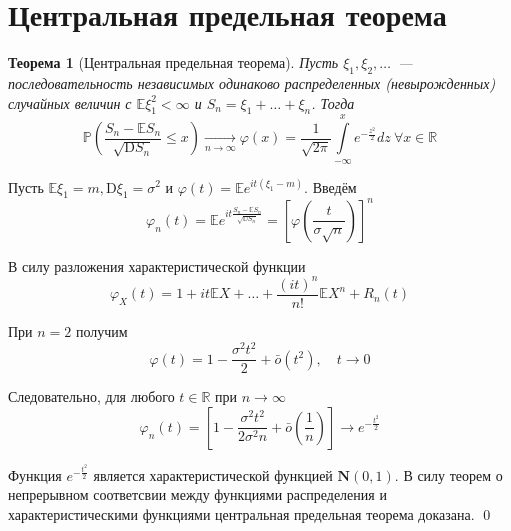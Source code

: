 \documentclass[oneside,final,14pt]{extreport}
\renewenvironment{proof}{{\bfseries Доказательство.}}{\qed}
\newtheorem{thm}{Теорема}[section]
\theoremstyle{definition}
\begin{document}
\section{Центральная предельная теорема}
\begin{thm}[Центральная предельная теорема]
    Пусть $\xi_{1}, \xi_{2}, \ldots$~--- последовательность независимых одинаково распределенных (невырожденных) случайных величин с $\mathbb{E} \xi_{1}^{2}<\infty$ и $S_{n}=\xi_{1}+\ldots+\xi_{n}$. Тогда
    \begin{equation*}
        \mathbb{P}\left(\frac{S_{n}-\mathbb{E} S_{n}}{\sqrt{\mathrm{D} S_{n}}} \leqslant x\right)
        \xrightarrow[n \rightarrow \infty]{}
        \varphi(x) = \frac{1}{\sqrt{2 \pi}} \int\limits_{-\infty}^{x} e^{-\frac{z^{2}}{2}} dz~ \forall x \in \mathbb{R}
    \end{equation*}
\end{thm}
\begin{proof}
Пусть $\mathbb{E} \xi_{1}=m, \mathrm{D} \xi_{1}=\sigma^{2}$ и $\varphi(t)=\mathbb{E} e^{i t\left(\xi_{1}-m\right)}$. Введём
\begin{equation*}
    \varphi_{n}(t)=\mathbb{E} e^{i t \frac{S_{n}-\mathbb{E} S_{n}}{\sqrt{\mathbb{D} S_{n}}}} = 
    \left[\varphi\left(\frac{t}{\sigma \sqrt{n}}\right)\right]^{n}
\end{equation*}

В силу разложения характеристической функции
\begin{equation*}
    \varphi_{X}(t)=1+i t \mathbb{E} X+\ldots+\frac{(i t)^{n}}{n !} \mathbb{E} X^{n}+R_{n}(t)
\end{equation*}

При $n=2$ получим 
\begin{equation*}
    \varphi(t)=1-\frac{\sigma^{2} t^{2}}{2}+\bar{o}\left(t^{2}\right), \quad t \rightarrow 0
\end{equation*}

Следовательно, для любого $t \in \mathbb{R}$ при $n \rightarrow \infty$
\begin{equation*}
    \varphi_{n}(t)=\left[1-\frac{\sigma^{2} t^{2}}{2 \sigma^{2} n}+\bar{o}\left(\frac{1}{n}\right)\right] \rightarrow e^{-\frac{t^{2}}{2}}
\end{equation*}

Функция $e^{-\frac{t^{2}}{2}}$ является характеристической функцией $\mathbf{N}(0,1)$. В силу теорем о непрерывном соответсвии между функциями распределения и характеристическими функциями центральная предельная теорема доказана.
\end{proof}
\end{document}
